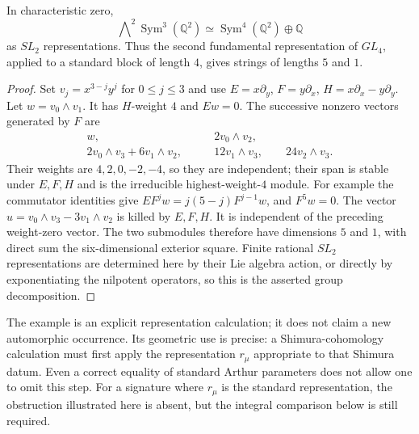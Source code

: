 \begin{proposition}
In characteristic zero,
\[
 \bigwedge\nolimits^2\operatorname{Sym}^3(\mathbb Q^2)
       \simeq\operatorname{Sym}^4(\mathbb Q^2)\oplus\mathbb Q
\]
as $SL_2$ representations. Thus the second fundamental
representation of $GL_4$, applied to a standard block of length
$4$, gives strings of lengths $5$ and $1$.
\end{proposition}
\begin{proof}
Set $v_j=x^{3-j}y^j$ for $0\le j\le3$ and use
$E=x\partial_y$, $F=y\partial_x$,
$H=x\partial_x-y\partial_y$. Let $w=v_0\wedge v_1$.
It has $H$-weight $4$ and $Ew=0$. The successive nonzero
vectors generated by $F$ are
\[
 \begin{split}
 w,&\qquad 2v_0\wedge v_2,\\
 2v_0\wedge v_3+6v_1\wedge v_2,&\qquad
 12v_1\wedge v_3,\qquad24v_2\wedge v_3.
 \end{split}
\]
Their weights are $4,2,0,-2,-4$, so they are independent;
their span is stable under $E,F,H$ and is the irreducible
highest-weight-$4$ module. For example the commutator identities
give $EF^jw=j(5-j)F^{j-1}w$, and $F^5w=0$.
The vector
$u=v_0\wedge v_3-3v_1\wedge v_2$ is killed by $E,F,H$.
It is independent of the preceding weight-zero vector.
The two submodules therefore have dimensions $5$ and $1$,
with direct sum the six-dimensional exterior square. Finite
rational $SL_2$ representations are determined here by their
Lie algebra action, or directly by exponentiating the nilpotent
operators, so this is the asserted group decomposition.
\end{proof}

The example is an explicit representation calculation; it does
not claim a new automorphic occurrence. Its geometric use is
precise: a Shimura-cohomology calculation must first apply the
representation $r_\mu$ appropriate to that Shimura datum.
Even a correct equality of standard Arthur parameters does not
allow one to omit this step. For a signature where $r_\mu$ is
the standard representation, the obstruction illustrated here
is absent, but the integral comparison below is still required.

